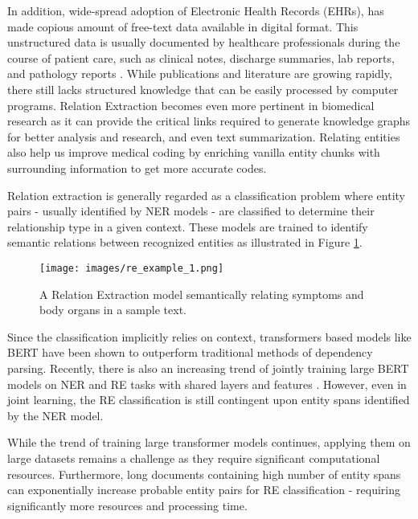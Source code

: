 \documentclass[letterpaper]{article}
\begin{document}
In addition, wide-spread adoption of Electronic Health Records (EHRs), has made copious amount of free-text data available in digital format. This unstructured data is usually documented by healthcare professionals during the course of patient care, such as clinical notes, discharge summaries, lab reports, and pathology reports \cite{wei2019relation}. While publications and literature are growing rapidly, there still lacks structured knowledge that can be easily processed by computer programs. Relation Extraction becomes even more pertinent in biomedical research as it can provide the critical links required to generate knowledge graphs for better analysis and research, and even text summarization. Relating entities also help us improve medical coding by enriching vanilla entity chunks with surrounding information to get more accurate codes.





Relation extraction is generally regarded as a classification problem where entity pairs - usually identified by NER models - are classified to determine their relationship type in a given context. These models are trained to identify semantic relations between recognized entities as illustrated in Figure \ref{fig:re_example_1}.

\begin{figure}[h!]
  \texttt{[image: images/re\_example\_1.png]}
  \caption{A Relation Extraction model semantically relating symptoms and body organs in a sample text.}
  \label{fig:re_example_1}
\end{figure}

Since the classification implicitly relies on context, transformers based models like BERT \cite{DBLP:journals/corr/abs-1810-04805} have been shown to outperform traditional methods of dependency parsing. Recently, there is also an increasing trend of jointly training large BERT models on NER and RE tasks with shared layers and features \cite{DBLP:journals/corr/abs-2010-03851}. However, even in joint learning, the RE classification is still contingent upon entity spans identified by the NER model.

While the trend of training large transformer models continues, applying them on large datasets remains a challenge as they require significant computational resources. Furthermore, long documents containing high number of entity spans can exponentially increase probable entity pairs for RE classification - requiring significantly more resources and processing time.
\end{document}

